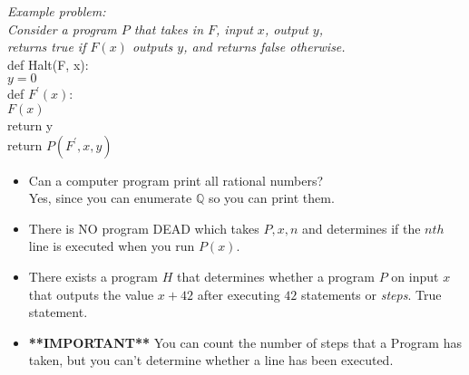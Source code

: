 \documentclass[a4paper]{article}
\newcommand{\Q}{\mathbb{Q}}
\begin{document}
\textit{Example problem: \\ \indent Consider a program $P$ that takes in $F$, input $x$, output $y$,\\ \indent returns true if $F(x)$ outputs $y$, and returns false otherwise. 
}\\
\indent def Halt(F, x):\\
\indent \indent $y = 0$ \\
\indent \indent def $F^{'}(x):$\\
\indent \indent \indent $F(x)$ \\
\indent \indent \indent return y \\
\indent \indent return $P(F^{'}, x, y)$\\



\begin{itemize}
    \item Can a computer program print all rational numbers? \\ \indent Yes, since you can enumerate $\Q$ so you can print them.
    \item There is NO program DEAD which takes $P, x, n$ and determines if the $nth$ line is executed when you run $P(x)$. 
    \item There exists a program $H$ that determines whether a program $P$ on input $x$ that outputs the value $x + 42$ after executing $42$ statements or \textit{steps}. True statement. 
    \item \textbf{**IMPORTANT**} You can count the number of steps that a Program has taken, but you can't determine whether a line has been executed. 
\end{itemize}
\end{document}
